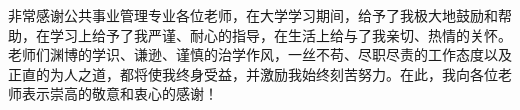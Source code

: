 

\begin{acknowledgment}

非常感谢公共事业管理专业各位老师，在大学学习期间，给予了我极大地鼓励和帮助，在学习上给予了我严谨、耐心的指导，在生活上给与了我亲切、热情的关怀。老师们渊博的学识、谦逊、谨慎的治学作风，一丝不苟、尽职尽责的工作态度以及正直的为人之道，都将使我终身受益，并激励我始终刻苦努力。在此，我向各位老师表示崇高的敬意和衷心的感谢！

\end{acknowledgment}

